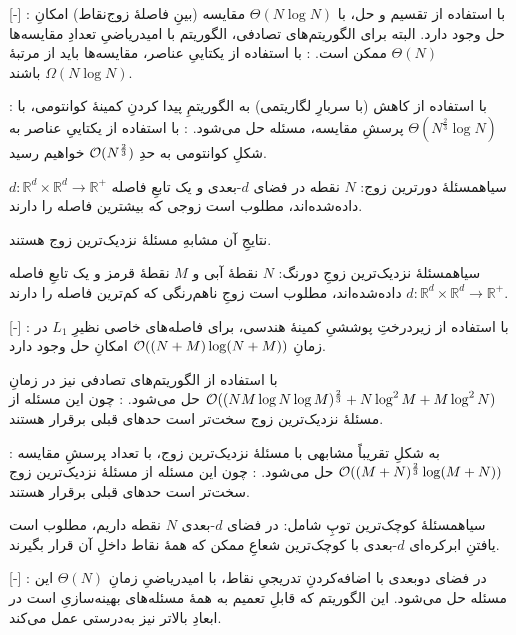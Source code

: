[-]
    : با استفاده از تقسیم و حل، با 
    $\Theta(N \log N)$ 
    مقایسه (بینِ فاصلهٔ زوج‌نقاط)
    امکانِ حل وجود دارد.
    البته برای الگوریتم‌های تصادفی، الگوریتم با امیدریاضیِ تعدادِ مقایسه‌ها
    $\Theta(N)$
    ممکن است.
    : با استفاده از یکتاییِ عناصر، مقایسه‌ها باید از مرتبهٔ
    $\Omega(N \log N)$
    باشند.

    : با استفاده از کاهش (با سربارِ لگاریتمی) به الگوریتمِ پیدا کردنِ کمینهٔ کوانتومی، با
    $\Theta(N^{\frac{2}{3}} \log N)$
    پرسشِ مقایسه، مسئله حل می‌شود.
    : با استفاده از یکتاییِ عناصر به شکلِ کوانتومی به حدِ
    $\mathcal{O}(N^{\frac{2}{3}})$
    خواهیم رسید.

‌سیاه{مسئلهٔ دورترین زوج}: 
\(N\)
نقطه در فضای \(d\)-بعدی و یک تابعِ فاصله 
\(d: \mathbb{R}^d \times \mathbb{R}^d \to \mathbb{R}^+\)
داده‌شده‌اند، مطلوب است زوجی که بیشترین فاصله را دارند.
 
نتایجِ آن مشابهِ مسئلهٔ نزدیک‌ترین زوج هستند.

‌سیاه{مسئلهٔ نزدیک‌ترین زوجِ دورنگ}: 
$N$
نقطهٔ آبی و $M$ نقطهٔ قرمز و یک تابعِ فاصله 
\(d: \mathbb{R}^d \times \mathbb{R}^d \to \mathbb{R}^+\)
داده‌شده‌اند، مطلوب است زوجِ ناهم‌رنگی که کم‌ترین فاصله را دارند. \cite[]{kao}

[-]
: با استفاده از زیردرختِ پوششیِ کمینهٔ هندسی، برای فاصله‌های خاصی نظیرِ $L_1$ در زمانِ 
$\mathcal{O}((N+M) \log (N+M))$
 امکانِ حل وجود دارد.

با استفاده از الگوریتم‌های تصادفی نیز در زمانِ
$\mathcal{O}((NM \log N\log M)^\frac{2}{3}+N\log^2M+M\log^2N)$
حل می‌شود.
: چون این مسئله از مسئلهٔ نزدیک‌ترین زوج سخت‌تر است حدهای قبلی برقرار هستند.

: به شکلِ تقریباً مشابهی با مسئلهٔ نزدیک‌ترین زوج، با تعداد پرسشِ مقایسه
$\mathcal{O}((M+N)^{\frac{2}{3}} \log (M+N))$
حل می‌شود.
: چون این مسئله از مسئلهٔ نزدیک‌ترین زوج سخت‌تر است حدهای قبلی برقرار هستند.


‌سیاه{مسئلهٔ کوچک‌ترین توپِ شامل}: در فضای $d$-بعدی $N$ نقطه داریم، مطلوب است یافتنِ ابرکره‌ای $d$-بعدی با کوچک‌ترین شعاعِ ممکن که همهٔ نقاط داخلِ آن قرار بگیرند.

[-]
: در فضای دوبعدی با اضافه‌کردنِ تدریجیِ نقاط، با امیدریاضیِ زمانِ
$\Theta(N)$
این مسئله حل می‌شود. این الگوریتم که قابلِ تعمیم به همهٔ مسئله‌های بهینه‌سازیِ 
است در ابعادِ بالاتر نیز به‌درستی عمل می‌کند.

